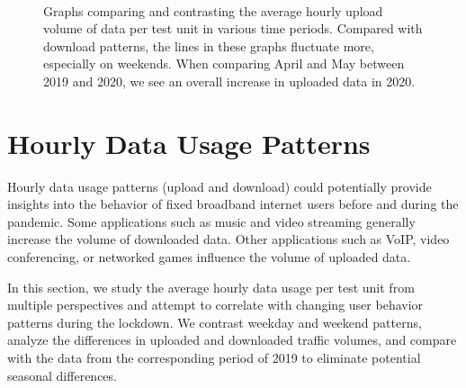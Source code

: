 \begin{figure}[th]
{    }
    \\
    \hspace{0.2cm}

    \caption{Graphs comparing and contrasting the average hourly upload volume of data per test unit in various time periods. Compared with download patterns, the lines in these graphs fluctuate more, especially on weekends. When comparing April and May between 2019 and 2020, we see an overall increase in uploaded data in 2020.}
  \label{fig:upload_data_per_user_hours_fig}
\end{figure}


\section{Hourly Data Usage Patterns}
\label{sec:hourly-data-usage-patterns}

Hourly data usage patterns (upload and download) could potentially provide insights into the behavior of fixed broadband internet users before and during the pandemic. Some applications such as music and video streaming generally increase the volume of downloaded data. Other applications such as VoIP, video conferencing, or networked games influence the volume of uploaded data.

In this section, we study the average hourly data usage per test unit from multiple perspectives and attempt to correlate with changing user behavior patterns during the lockdown. We contrast weekday and weekend patterns, analyze the differences in uploaded and downloaded traffic volumes, and compare with the data from the corresponding period of 2019 to eliminate potential seasonal differences.

